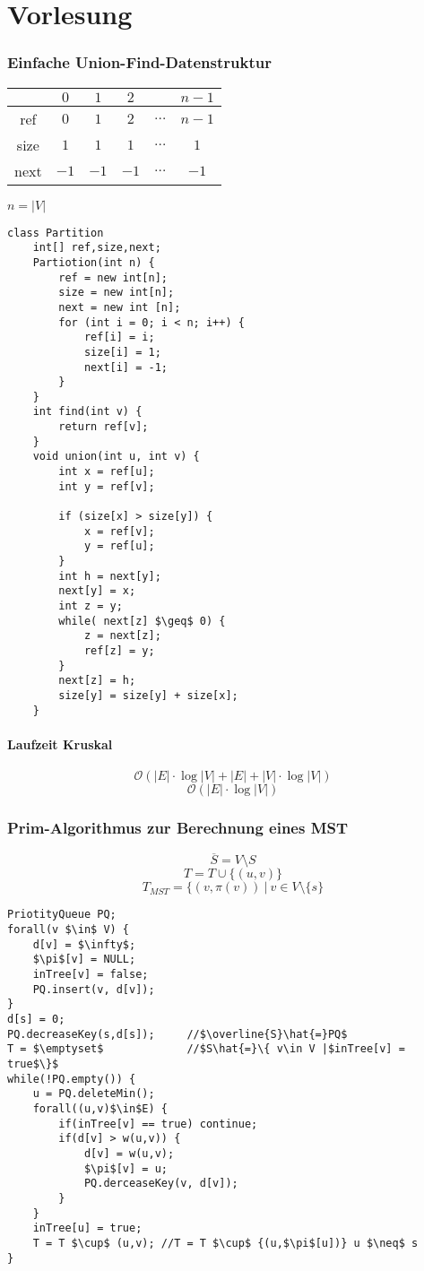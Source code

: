 \chapter{Vorlesung}
\subsection{Einfache Union-Find-Datenstruktur}
\begin{tabular}{c|c|c|c|c|c|}
	    &$0$&$1$&$2$&        &$n-1$\\ \hline
	ref &$0$&$1$&$2$&$\ldots$&$n-1$\\ \hline
	size&$1$&$1$&$1$&$\ldots$&  $1$\\ \hline
	next&$-1$&$-1$&$-1$&$\ldots$&$-1$\\ \hline	
\end{tabular}
$n=|V|$\\
\begin{lstlisting}
class Partition
	int[] ref,size,next;
	Partiotion(int n) {
		ref = new int[n];
		size = new int[n];
		next = new int [n];
		for (int i = 0; i < n; i++) {
			ref[i] = i;
			size[i] = 1;
			next[i] = -1;
		}
	}
	int find(int v) {
		return ref[v];
	}
	void union(int u, int v) {
		int x = ref[u];
		int y = ref[v];
		
		if (size[x] > size[y]) {
			x = ref[v];
			y = ref[u];
		}
		int h = next[y];
		next[y] = x;
		int z = y;
		while( next[z] $\geq$ 0) {
			z = next[z];
			ref[z] = y;
		}
		next[z] = h;
		size[y] = size[y] + size[x];
	}
\end{lstlisting}
\subsubsection{Laufzeit Kruskal}
\[ \mathcal{O}(|E|\cdot\log|V|+|E|+|V|\cdot\log|V|) \]
\[ \mathcal{O}(|E|\cdot\log|V|) \]
\subsection{Prim-Algorithmus zur Berechnung eines MST}
\[ \overline{S} = V \setminus S \]
\[ T=T\cup \{ (u,v) \} \]
\[ T_{MST}=\{ (v,\pi(v))~|~v\in V\setminus\{ s \} \]
\begin{lstlisting}
PriotityQueue PQ;
forall(v $\in$ V) {
	d[v] = $\infty$;
	$\pi$[v] = NULL;
	inTree[v] = false;
	PQ.insert(v, d[v]);
}
d[s] = 0;
PQ.decreaseKey(s,d[s]);		//$\overline{S}\hat{=}PQ$
T = $\emptyset$				//$S\hat{=}\{ v\in V |$inTree[v] = true$\}$
while(!PQ.empty()) {
	u = PQ.deleteMin();
	forall((u,v)$\in$E) {
		if(inTree[v] == true) continue;
		if(d[v] > w(u,v)) {
			d[v] = w(u,v);
			$\pi$[v] = u;
			PQ.derceaseKey(v, d[v]);
		}
	}
	inTree[u] = true;
	T = T $\cup$ (u,v);	//T = T $\cup$ {(u,$\pi$[u])} u $\neq$ s
}
\end{lstlisting}
